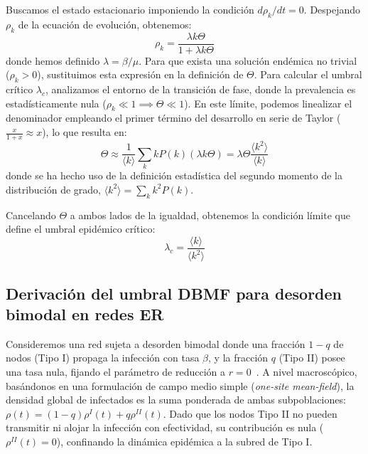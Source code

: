 \documentclass[%
reprint,
amsmath,amssymb,
aps,
]{revtex4-2}
\begin{document}
	Buscamos el estado estacionario imponiendo la condición $d\rho_k/dt = 0$. Despejando $\rho_k$ de la ecuación de evolución, obtenemos:
	\begin{equation}
		\rho_k = \frac{\lambda k \Theta}{1 + \lambda k \Theta}
	\end{equation}
	donde hemos definido $\lambda = \beta/\mu$. Para que exista una solución endémica no trivial ($\rho_k > 0$), sustituimos esta expresión en la definición de $\Theta$. Para calcular el umbral crítico $\lambda_c$, analizamos el entorno de la transición de fase, donde la prevalencia es estadísticamente nula ($\rho_k \ll 1 \implies \Theta \ll 1$). En este límite, podemos linealizar el denominador empleando el primer término del desarrollo en serie de Taylor ($\frac{x}{1+x} \approx x$), lo que resulta en:
	\begin{equation}
		\Theta \approx \frac{1}{\langle k \rangle} \sum_k k P(k) (\lambda k \Theta) = \lambda \Theta \frac{\langle k^2 \rangle}{\langle k \rangle}
	\end{equation}
	donde se ha hecho uso de la definición estadística del segundo momento de la distribución de grado, $\langle k^2 \rangle = \sum_k k^2 P(k)$.
	
	Cancelando $\Theta$ a ambos lados de la igualdad, obtenemos la condición límite que define el umbral epidémico crítico:
	\begin{equation}
		\lambda_c = \frac{\langle k \rangle}{\langle k^2 \rangle}
	\end{equation}
	
	\subsection{Derivación del umbral DBMF para desorden bimodal en redes ER}
	\label{apendice:bimodal_dbmf}
	
	Consideremos una red sujeta a desorden bimodal donde una fracción $1-q$ de nodos (Tipo I) propaga la infección con tasa $\beta$, y la fracción $q$ (Tipo II) posee una tasa nula, fijando el parámetro de reducción a $r=0$~\cite{Muñoz2010,PastorSatorras2015,Noest1986}. A nivel macroscópico, basándonos en una formulación de campo medio simple (\textit{one-site mean-field}), la densidad global de infectados es la suma ponderada de ambas subpoblaciones: $\rho(t) = (1-q)\rho^I(t) + q\rho^{II}(t)$. Dado que los nodos Tipo II no pueden transmitir ni alojar la infección con efectividad, su contribución es nula ($\rho^{II}(t) = 0$), confinando la dinámica epidémica a la subred de Tipo I.
	
\end{document}
